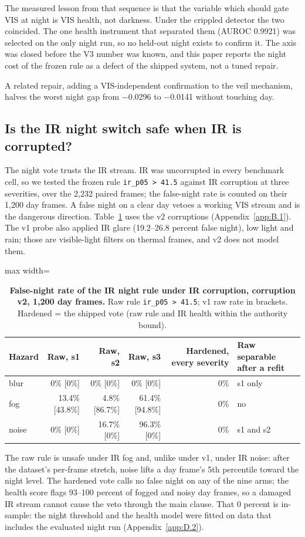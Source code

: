 \documentclass[10pt]{article}
\begin{document}
The measured lesson from that sequence is that the variable which should gate VIS at night is VIS health, not darkness. Under the crippled detector the two coincided. The one health instrument that separated them (AUROC 0.9921) was selected on the only night run, so no held-out night exists to confirm it. The axis was closed before the V3 number was known, and this paper reports the night cost of the frozen rule as a defect of the shipped system, not a tuned repair.

A related repair, adding a VIS-independent confirmation to the veil mechanism, halves the worst night gap from $-$0.0296 to $-$0.0141 without touching day.

\subsection{Is the IR night switch safe when IR is corrupted?}\label{app:D.5}
The night vote trusts the IR stream. IR was uncorrupted in every benchmark cell, so we tested the frozen rule \texttt{ir\_\allowbreak{}p05 > 41.5} against IR corruption at three severities, over the 2,232 paired frames; the false-night rate is counted on their 1,200 day frames. A false night on a clear day vetoes a working VIS stream and is the dangerous direction. Table~\ref{tab:8} uses the v2 corruptions (Appendix~\ref{app:B.1}). The v1 probe also applied IR glare (19.2--26.8 percent false night), low light and rain; those are visible-light filters on thermal frames, and v2 does not model them.

\begin{table}[htbp]
\centering
\footnotesize
\caption{\textbf{False-night rate of the IR night rule under IR corruption, corruption v2, 1,200 day frames.} Raw rule \texttt{ir\_\allowbreak{}p05 > 41.5}; v1 raw rate in brackets. Hardened = the shipped vote (raw rule and IR health within the authority bound).}
\label{tab:8}
\begin{adjustbox}{max width=\linewidth}
\begin{tabular}{lrrrrl}
\toprule
Hazard & Raw, s1 & Raw, s2 & Raw, s3 & Hardened, every severity & Raw separable after a refit \\
\midrule
blur & 0\% [0\%] & 0\% [0\%] & 0\% [0\%] & 0\% & s1 only \\
fog & 13.4\% [43.8\%] & 4.8\% [86.7\%] & 61.4\% [94.8\%] & 0\% & no \\
noise & 0\% [0\%] & 16.7\% [0\%] & 96.3\% [0\%] & 0\% & s1 and s2 \\
\bottomrule
\end{tabular}
\end{adjustbox}
\end{table}
The raw rule is unsafe under IR fog and, unlike under v1, under IR noise: after the dataset's per-frame stretch, noise lifts a day frame's 5th percentile toward the night level. The hardened vote calls no false night on any of the nine arms; the health score flags 93--100 percent of fogged and noisy day frames, so a damaged IR stream cannot cause the veto through the main clause. That 0 percent is in-sample: the night threshold and the health model were fitted on data that includes the evaluated night run (Appendix~\ref{app:D.2}).
\end{document}
